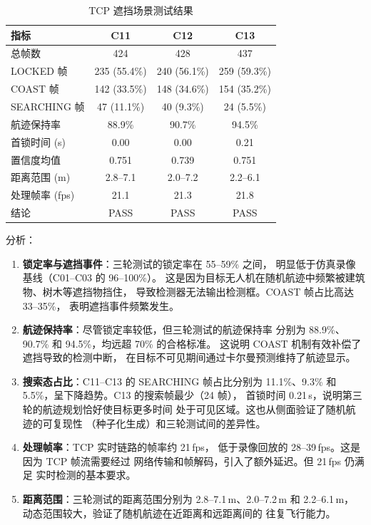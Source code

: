\documentclass[12pt, a4paper]{ctexart}
\begin{document}
\begin{table}[H]
\centering
\caption{TCP 遮挡场景测试结果}
\label{tab:tcp}
\begin{tabular}{lccc}
\toprule
\textbf{指标} & \textbf{C11} & \textbf{C12} & \textbf{C13} \\
\midrule
总帧数 & 424 & 428 & 437 \\
LOCKED 帧 & 235 (55.4\%) & 240 (56.1\%) & 259 (59.3\%) \\
COAST 帧 & 142 (33.5\%) & 148 (34.6\%) & 154 (35.2\%) \\
SEARCHING 帧 & 47 (11.1\%) & 40 (9.3\%) & 24 (5.5\%) \\
航迹保持率 & 88.9\% & 90.7\% & 94.5\% \\
首锁时间 (s) & 0.00 & 0.00 & 0.21 \\
置信度均值 & 0.751 & 0.739 & 0.751 \\
距离范围 (m) & 2.8--7.1 & 2.0--7.2 & 2.2--6.1 \\
处理帧率 (fps) & 21.1 & 21.3 & 21.8 \\
结论 & PASS & PASS & PASS \\
\bottomrule
\end{tabular}
\end{table}

分析：

\begin{enumerate}
  \item \textbf{锁定率与遮挡事件}：三轮测试的锁定率在 55--59\% 之间，
        明显低于仿真录像基线（C01--C03 的 96--100\%）。
        这是因为目标无人机在随机航迹中频繁被建筑物、树木等遮挡物挡住，
        导致检测器无法输出检测框。COAST 帧占比高达 33--35\%，
        表明遮挡事件频繁发生。

  \item \textbf{航迹保持率}：尽管锁定率较低，但三轮测试的航迹保持率
        分别为 88.9\%、90.7\% 和 94.5\%，均远超 70\% 的合格标准。
        这说明 COAST 机制有效补偿了遮挡导致的检测中断，
        在目标不可见期间通过卡尔曼预测维持了航迹显示。

  \item \textbf{搜索态占比}：C11--C13 的 SEARCHING 帧占比分别为
        11.1\%、9.3\% 和 5.5\%，呈下降趋势。C13 的搜索帧最少（24 帧），
        首锁时间 0.21\,s，说明第三轮的航迹规划恰好使目标更多时间
        处于可见区域。这也从侧面验证了随机航迹的可复现性
        （种子化生成）和三轮测试间的差异性。

  \item \textbf{处理帧率}：TCP 实时链路的帧率约 21\,fps，
        低于录像回放的 28--39\,fps。这是因为 TCP 帧流需要经过
        网络传输和帧解码，引入了额外延迟。但 21\,fps 仍满足
        实时检测的基本要求。

  \item \textbf{距离范围}：三轮测试的距离范围分别为
        2.8--7.1\,m、2.0--7.2\,m 和 2.2--6.1\,m，
        动态范围较大，验证了随机航迹在近距离和远距离间的
        往复飞行能力。
\end{enumerate}
\end{document}
